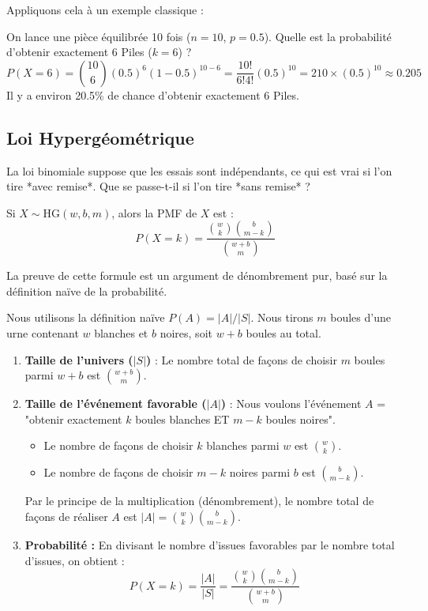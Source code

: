 Appliquons cela à un exemple classique :

\begin{examplebox}
On lance une pièce équilibrée 10 fois ($n=10$, $p=0.5$). Quelle est la probabilité d'obtenir exactement 6 Piles ($k=6$) ?
$$ P(X=6) = \binom{10}{6} (0.5)^6 (1-0.5)^{10-6} = \frac{10!}{6!4!} (0.5)^{10} = 210 \times (0.5)^{10} \approx 0.205 $$
Il y a environ 20.5\% de chance d'obtenir exactement 6 Piles.
\end{examplebox}

\subsection{Loi Hypergéométrique}

La loi binomiale suppose que les essais sont indépendants, ce qui est vrai si l'on tire *avec remise*. Que se passe-t-il si l'on tire *sans remise* ?

\begin{theorembox}
Si $X \sim \text{HG}(w, b, m)$, alors la PMF de $X$ est :
$$ P(X=k) = \frac{\binom{w}{k} \binom{b}{m-k}}{\binom{w+b}{m}} $$
\end{theorembox}

La preuve de cette formule est un argument de dénombrement pur, basé sur la définition naïve de la probabilité.

\begin{proofbox}
Nous utilisons la définition naïve $P(A) = |A| / |S|$.
Nous tirons $m$ boules d'une urne contenant $w$ blanches et $b$ noires, soit $w+b$ boules au total.

\begin{enumerate}
    \item \textbf{Taille de l'univers ($|S|$)} : Le nombre total de façons de choisir $m$ boules parmi $w+b$ est $\binom{w+b}{m}$.
    
    \item \textbf{Taille de l'événement favorable ($|A|$)} : Nous voulons l'événement $A$ = "obtenir exactement $k$ boules blanches ET $m-k$ boules noires".
    \begin{itemize}
        \item Le nombre de façons de choisir $k$ blanches parmi $w$ est $\binom{w}{k}$.
        \item Le nombre de façons de choisir $m-k$ noires parmi $b$ est $\binom{b}{m-k}$.
    \end{itemize}
    Par le principe de la multiplication (dénombrement), le nombre total de façons de réaliser $A$ est $|A| = \binom{w}{k} \binom{b}{m-k}$.
    
    \item \textbf{Probabilité :} En divisant le nombre d'issues favorables par le nombre total d'issues, on obtient :
    $$ P(X=k) = \frac{|A|}{|S|} = \frac{\binom{w}{k} \binom{b}{m-k}}{\binom{w+b}{m}} $$
\end{enumerate}
\end{proofbox}

